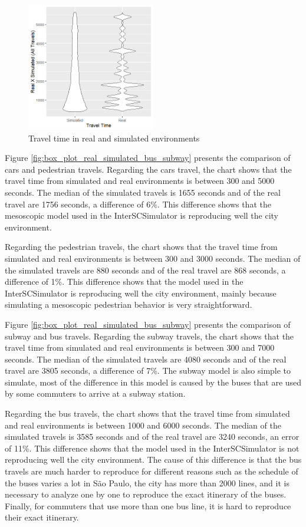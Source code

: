\begin{figure}[!htb]
\centering
\includegraphics[width=0.5\textwidth]{figuras/chap-sp/total.png}
\caption{Travel time in real and simulated environments}
\label{fig:box_plot_real_simulated}
\end{figure}

Figure \ref{fig:box_plot_real_simulated_bus_subway} presents the comparison of cars and pedestrian travels. Regarding the cars travel, the chart shows that the travel time from simulated and real environments is between 300 and 5000 seconds. The median of the simulated travels is 1655 seconds and of the real travel are 1756 seconds, a difference of 6\%. This difference shows that the mesoscopic model used in the InterSCSimulator is reproducing well the city environment.

Regarding the pedestrian travels, the chart shows that the travel time from simulated and real environments is between 300 and 3000 seconds. The median of the simulated travels are 880 seconds and of the real travel are 868 seconds, a difference of 1\%. This difference shows that the model used in the InterSCSimulator is reproducing well the city environment, mainly because simulating a mesoscopic pedestrian behavior is very straightforward.

Figure \ref{fig:box_plot_real_simulated_bus_subway} presents the comparison of subway and bus travels. Regarding the subway travels, the chart shows that the travel time from simulated and real environments is between 300 and 7000 seconds. The median of the simulated travels are 4080 seconds and of the real travel are 3805 seconds, a difference of 7\%. The subway model is also simple to simulate, most of the difference in this model is caused by the buses that are used by some commuters to arrive at a subway station.

Regarding the bus travels, the chart shows that the travel time from simulated and real environments is between 1000 and 6000 seconds. The median of the simulated travels is 3585 seconds and of the real travel are 3240 seconds, an error of 11\%. This difference shows that the model used in the InterSCSimulator is not reproducing well the city environment. The cause of this difference is that the bus travels are much harder to reproduce for different reasons such as the schedule of the buses varies a lot in S\~ao Paulo, the city has more than 2000 lines, and it is necessary to analyze one by one to reproduce the exact itinerary of the buses. Finally, for commuters that use more than one bus line, it is hard to reproduce their exact itinerary.

